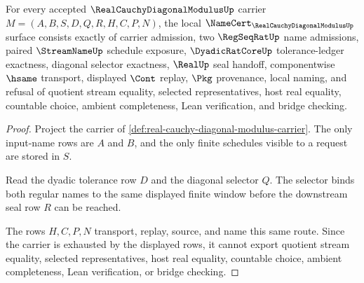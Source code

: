 \begin{theorem}
\label{thm:real-cauchy-diagonal-modulus-namecert-obligations}
For every accepted $\RealCauchyDiagonalModulusUp$ carrier $M=(A,B,S,D,Q,R,H,C,P,N)$, the local $\NameCert_{\RealCauchyDiagonalModulusUp}$ surface consists exactly of carrier admission, two $\RegSeqRatUp$ name admissions, paired $\StreamNameUp$ schedule exposure, $\DyadicRatCoreUp$ tolerance-ledger exactness, diagonal selector exactness, $\RealUp$ seal handoff, componentwise $\hsame$ transport, displayed $\Cont$ replay, $\Pkg$ provenance, local naming, and refusal of quotient stream equality, selected representatives, host real equality, countable choice, ambient completeness, Lean verification, and bridge checking.
\end{theorem}
\begin{proof}
Project the carrier of \autoref{def:real-cauchy-diagonal-modulus-carrier}. The only input-name rows are $A$ and $B$, and the only finite schedules visible to a request are stored in $S$.

Read the dyadic tolerance row $D$ and the diagonal selector $Q$. The selector binds both regular names to the same displayed finite window before the downstream seal row $R$ can be reached.

The rows $H,C,P,N$ transport, replay, source, and name this same route. Since the carrier is exhausted by the displayed rows, it cannot export quotient stream equality, selected representatives, host real equality, countable choice, ambient completeness, Lean verification, or bridge checking.
\end{proof}

